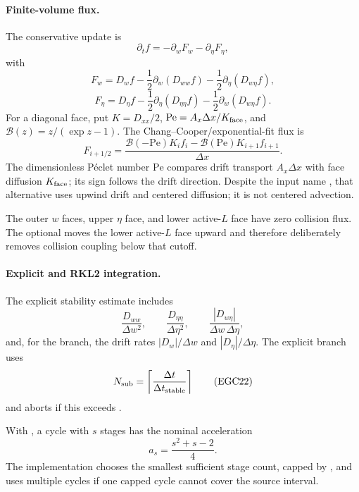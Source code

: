 \paragraph{Finite-volume flux.}
The conservative update is
\[
 \partial_t f=-\partial_wF_w-\partial_\eta F_\eta,        \tag{EGC17}
\]
with
\[
 F_w=D_wf-\frac12\partial_w(D_{ww}f)
             -\frac12\partial_\eta(D_{w\eta}f),           \tag{EGC18}
\]
\[
 F_\eta=D_\eta f-\frac12\partial_\eta(D_{\eta\eta}f)
             -\frac12\partial_w(D_{w\eta}f).              \tag{EGC19}
\]
For a diagonal face, put \(K=D_{xx}/2\),
\(\mathrm{Pe}=A_x\Delta x/K_{\rm face}\), and
\(\mathcal B(z)=z/(\exp z-1)\).  The Chang--Cooper/exponential-fit flux is
\[
 F_{i+1/2}
 =
 \frac{
  \mathcal B(-\mathrm{Pe})K_i f_i
  -\mathcal B(\mathrm{Pe})K_{i+1}f_{i+1}}
 {\Delta x}.                                             \tag{EGC20}
\]
The dimensionless P\'eclet number \(\mathrm{Pe}\) compares drift transport
\(A_x\Delta x\) with face diffusion \(K_{\rm face}\); its sign follows the
drift direction.
Despite the input name , that alternative uses upwind drift
and centered diffusion; it is not centered advection.

The outer \(w\) faces, upper \(\eta\) face, and lower active-\(L\) face have
zero collision flux.  The optional
 moves the lower active-\(L\) face upward and
therefore deliberately removes collision coupling below that cutoff.

\paragraph{Explicit and RKL2 integration.}
The explicit stability estimate includes
\[
 \frac{D_{ww}}{\Delta w^2},\qquad
 \frac{D_{\eta\eta}}{\Delta\eta^2},\qquad
 \frac{|D_{w\eta}|}{\Delta w\,\Delta\eta},                \tag{EGC21}
\]
and, for the  branch, the drift rates
\(|D_w|/\Delta w\) and \(|D_\eta|/\Delta\eta\).
The explicit branch uses
\[
 N_{\rm sub}=\left\lceil
 \frac{\Delta t}{\Delta t_{\rm stable}}\right\rceil       \tag{EGC22}
\]
and aborts if this exceeds .

With , a cycle with \(s\) stages has
the nominal acceleration
\[
 a_s=\frac{s^2+s-2}{4}.                                  \tag{EGC23}
\]
The implementation chooses the smallest sufficient stage count, capped by
, and uses multiple cycles if one capped cycle cannot
cover the source interval.


